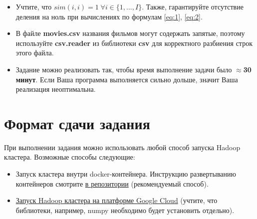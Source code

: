 \documentclass[11pt, fleqn]{article}
\begin{document}
\begin{itemize}
	\item Учтите, что $sim(i, i) = 1 \;\forall i \in \{1,...,I\}$. Также, гарантируйте отсутствие деления на ноль при вычислениях по формулам \ref{eq:1}, \ref{eq:2}.
	\item В файле \textbf{movies.csv} названия фильмов могут содержать запятые, поэтому используйте \textbf{csv.reader} из библиотеки \textbf{csv} для корректного разбиения строк этого файла.
	\item Задание можно реализовать так, чтобы время выполнение задачи было $\approx$\textbf{30 минут}. Если Ваша программа выполняется сильно дольше, значит Ваша реализация неоптимальна.
\end{itemize}

\section{Формат сдачи задания}
При выполнении задания можно использовать любой способ запуска Hadoop кластера. Возможные способы следующие:
\begin{itemize}
	\item Запуск кластера внутри docker-контейнера. Инструкцию развертыванию контейнеров смотрите  \href{https://github.com/nakhodnov17/docker-hadoop-spark}{в репозитории} (рекомендуемый способ).
	\item \href{https://medium.com/google-cloud/launch-a-hadoop-cluster-in-90-seconds-or-less-in-google-cloud-dataproc-b3acc1c02598}{Запуск Hadoop кластера на платформе Google Cloud} (учтите, что библиотеки, например, numpy необходимо будет установить отдельно).
\end{itemize}
\end{document}
